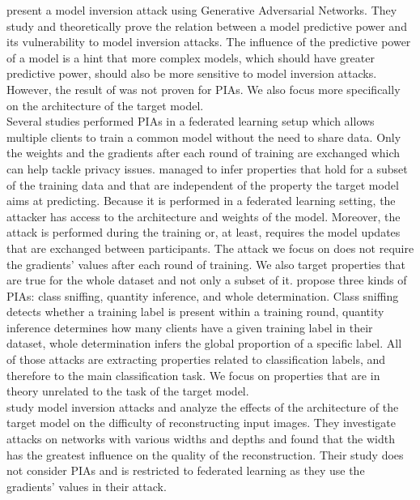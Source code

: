 \documentclass[11pt]{article}
\begin{document}
\citet{Zhang2019} present a model inversion attack using Generative Adversarial Networks. They study and theoretically prove the relation between a model predictive power and its vulnerability to model inversion attacks. The influence of the predictive power of a model is a hint that more complex models, which should have greater predictive power, should also be more sensitive to model inversion attacks. However, the result of \citet{Zhang2019} was not proven for PIAs. We also focus more specifically on the architecture of the target model.\\
Several studies \cite{Melis2019, Wang2019} performed PIAs in a federated learning \cite{shokri2015privacy} setup which allows multiple clients to train a common model without the need to share data. Only the weights and the gradients after each round of training are exchanged which can help tackle privacy issues. \citet{Melis2019} managed to infer properties that hold for a subset of the training data and that are independent of the property the target model aims at predicting. Because it is performed in a federated learning setting, the attacker has access to the architecture and weights of the model. Moreover, the attack is performed during the training or, at least, requires the model updates that are exchanged between participants. The attack we focus on does not require the gradients' values after each round of training. We also target properties that are true for the whole dataset and not only a subset of it. \citet{Wang2019} propose three kinds of PIAs: class sniffing, quantity inference, and whole determination. Class sniffing detects whether a training label is present within a training round, quantity inference determines how many clients have a given training label in their dataset, whole determination infers the global proportion of a specific label. All of those attacks are extracting properties related to classification labels, and therefore to the main classification task. We focus on properties that are in theory unrelated to the task of the target model.\\
\citet{Geiping2020} study model inversion attacks and analyze the effects of the architecture of the target model on the difficulty of reconstructing input images. They investigate attacks on networks with various widths and depths and found that the width has the greatest influence on the quality of the reconstruction. Their study does not consider PIAs and is restricted to federated learning as they use the gradients' values in their attack.\\
\end{document}
